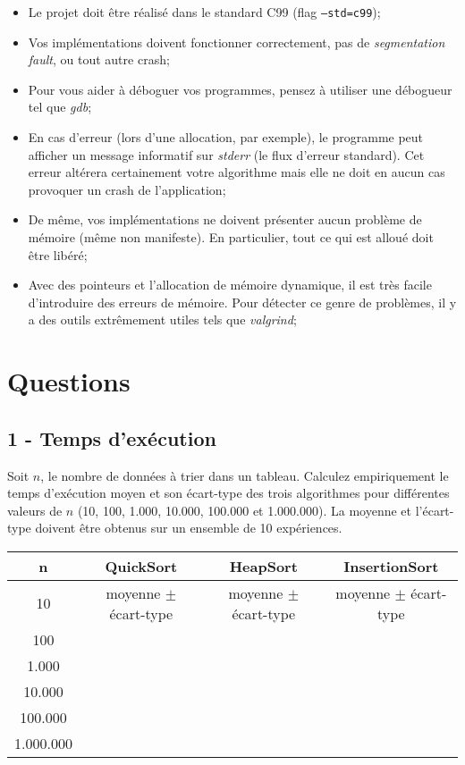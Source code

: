 \documentclass[a4paper,10pt]{article}
\begin{document}
\begin{itemize}
\item Le projet doit être réalisé dans le standard C99 (flag \texttt{--std=c99});
\item Vos implémentations doivent fonctionner correctement, pas de {\em segmentation fault}, ou tout autre crash;
\item Pour vous aider à déboguer vos programmes, pensez à utiliser une débogueur tel que {\em gdb};
\item En cas d'erreur (lors d'une allocation, par exemple), le programme peut afficher un message informatif sur {\em stderr} (le flux d'erreur standard). Cet erreur altérera certainement votre algorithme mais elle ne doit en aucun cas provoquer un crash de l'application;
\item De même, vos implémentations ne doivent présenter aucun problème de mémoire (même non manifeste). En particulier, tout ce qui est alloué doit être libéré;
\item Avec des pointeurs et l’allocation de mémoire dynamique, il est très facile d’introduire des erreurs de mémoire. Pour détecter ce genre de problèmes, il y a des outils extrêmement utiles tels que {\em valgrind};
\end{itemize}

\section*{Questions}
\subsection*{1 - Temps d'exécution}

Soit $n$, le nombre de données à trier dans un tableau. Calculez empiriquement
le temps d'exécution moyen et son écart-type des trois algorithmes pour
différentes valeurs de $n$ (10, 100, 1.000, 10.000, 100.000 et 1.000.000). La
moyenne et l'écart-type doivent être obtenus sur un ensemble de 10 expériences.

\begin{center}
\begin{tabular}{cccc}
	\hline
	n & QuickSort & HeapSort & InsertionSort \\
	\hline
	10 & moyenne $\pm$ écart-type & moyenne $\pm$ écart-type & moyenne $\pm$ écart-type\\
	100 & & &\\
	1.000 & & &\\
	10.000 & & &\\
	100.000 & & &\\
	1.000.000 & & &\\
\end{tabular}
\end{center}
\end{document}

